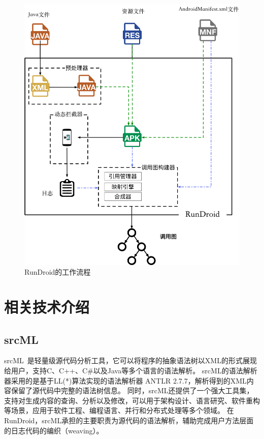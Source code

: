 \begin{figure}[ht]
	\centering
	\includegraphics[height=0.5\textheight]{./Figures/rundroid-overview.png}
	\caption{ RunDroid的工作流程}
	\label{fig:rundroid_overview}
\end{figure}


\section{相关技术介绍}


\subsection{srcML}
srcML~\cite{collard2013srcml}是轻量级源代码分析工具，它可以将程序的抽象语法树以XML的形式展现给用户，支持C、C++、C\#以及Java等多个语言的语法解析。
srcML的语法解析器采用的是基于LL(*)算法实现的语法解析器 ANTLR 2.7.7，解析得到的XML内容保留了源代码中完整的语法树信息。
同时，srcML还提供了一个强大工具集，支持对生成内容的查询、分析以及修改，可以用于架构设计、语言研究、软件重构等场景，应用于软件工程、编程语言、并行和分布式处理等多个领域。
在RunDroid，srcML承担的主要职责为源代码的语法解析，辅助完成用户方法层面的日志代码的编织（weaving）。

